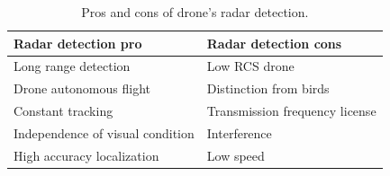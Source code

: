 \begin{table}[h!]
\centering
\begin{tabular}{|l|l|}
\hline
{\color[HTML]{000000} \textbf{Radar detection pro}}     & {\color[HTML]{000000} \textbf{Radar detection cons}}  \\ \hline
{\color[HTML]{000000} Long range detection}             & {\color[HTML]{000000} Low RCS drone}                \\ \hline
{\color[HTML]{000000} Drone autonomous flight}        & {\color[HTML]{000000} Distinction from birds}         \\ \hline
{\color[HTML]{000000} Constant tracking}                & {\color[HTML]{000000} Transmission frequency license} \\ \hline
{\color[HTML]{000000} Independence of visual condition} & {\color[HTML]{000000} Interference}                   \\ \hline
{\color[HTML]{000000} High accuracy localization}       & {\color[HTML]{000000} Low speed}                      \\ \hline
\end{tabular}
\caption{Pros and cons of drone's radar detection.}
\label{tab:prosandcons}
\end{table}

\newpage

